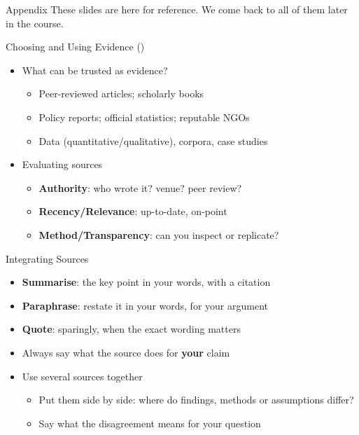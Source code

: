 \documentclass[aspectratio=169]{beamer}
\begin{document}
\AtBeginSection[]{}
\appendix

\begin{frame}{Appendix}
These slides are here for reference.  We come back to all of them later in
the course.
\end{frame}

\begin{frame}{Choosing and Using Evidence (\dateSources)}
  \begin{itemize}
  \item What can be trusted as evidence?
    \begin{itemize}
    \item Peer-reviewed articles; scholarly books
    \item Policy reports; official statistics; reputable NGOs
    \item Data (quantitative/qualitative), corpora, case studies
    \end{itemize}
  \item Evaluating sources
    \begin{itemize}
    \item \textbf{Authority}: who wrote it? venue? peer review?
    \item \textbf{Recency/Relevance}: up-to-date, on-point
    \item \textbf{Method/Transparency}: can you inspect or replicate?
    \end{itemize}
  \end{itemize}
\end{frame}

\begin{frame}{Integrating Sources}
\begin{itemize}
  \item \textbf{Summarise}: the key point in your words, with a citation
  \item \textbf{Paraphrase}: restate it in your words, for your argument
  \item \textbf{Quote}: sparingly, when the exact wording matters
  \item Always say what the source does for \textbf{your} claim
  \item Use several sources together
    \begin{itemize}
    \item Put them side by side: where do findings, methods or assumptions differ?
    \item Say what the disagreement means for your question
    \end{itemize}
  \end{itemize}
\end{frame}
\end{document}
